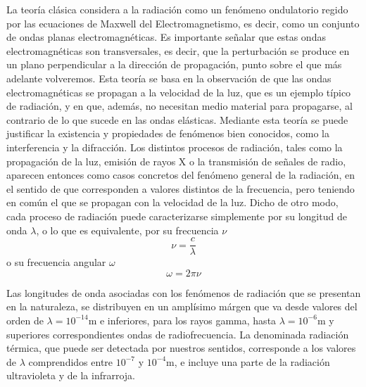 La teoría clásica considera a la radiación como un fenómeno ondulatorio regido por las ecuaciones de Maxwell del Electromagnetismo, es decir, como un conjunto de ondas planas electromagnéticas.
Es importante señalar que estas ondas electromagnéticas son transversales, es decir, que la perturbación se produce en un plano perpendicular a la dirección de propagación, punto sobre el que más adelante volveremos.
Esta teoría se basa en la observación de que las ondas electromagnéticas se propagan a la velocidad de la luz, que es un ejemplo típico de radiación, y en que, además, no necesitan medio material para propagarse, al contrario de lo que sucede en las ondas elásticas.
Mediante esta teoría se puede justificar la existencia y propiedades de fenómenos bien conocidos, como la interferencia y la difracción.
Los distintos procesos de radiación, tales como la propagación de la luz, emisión de rayos X o la transmisión de señales de radio, aparecen entonces como casos concretos del fenómeno general de la radiación, en el sentido de que corresponden a valores distintos de la frecuencia, pero teniendo en común el que se propagan con la velocidad de la luz.
Dicho de otro modo, cada proceso de radiación puede caracterizarse simplemente por su longitud de onda $\lambda$, o lo que es equivalente, por su frecuencia $\nu$
\begin{equation}\label{eq:freq_t8}
	\nu = \frac{c}{\lambda}
\end{equation}
o su frecuencia angular $\omega$
\begin{equation}
	\omega = 2\pi\nu
\end{equation}

Las longitudes de onda asociadas con los fenómenos de radiación que se presentan en la naturaleza, se distribuyen en un amplísimo márgen que va desde valores del orden de $\lambda = 10^{-14}$m e inferiores, para los rayos gamma, hasta $\lambda = 10^{-6}$m y superiores correspondientes ondas de radiofrecuencia.
La denominada radiación térmica, que puede ser detectada por nuestros sentidos, corresponde a los valores de $\lambda$ comprendidos entre $10^{-7}$ y $10^{-4}$m, e incluye una parte de la radiación ultravioleta y de la infrarroja.

